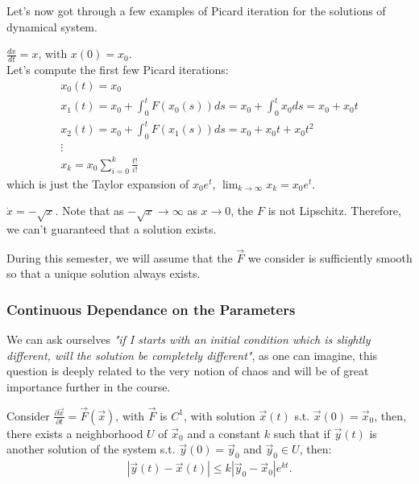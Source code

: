 Let's now got through a few examples of Picard iteration for the solutions of dynamical system.

\begin{example}
    $\frac{dx}{dt} = x$, with $x(0) = x_0$. \\ 
    
    Let's compute the first few Picard iterations:
    \begin{align*}
        x_0(t) = x_0\\
        x_1(t) = x_0 + \int_0^t F(x_0(s)) ds = x_0 + \int_0^t x_0 ds = x_0 + x_0 t  \\
        x_2(t) = x_0 + \int_0^t F(x_1(s)) ds = x_0 + x_0 t + x_0 t^2 \\
        \vdots \\
        x_k = x_0 \sum^k_{i=0} \frac{t!}{i!}
    \end{align*}
    which is just the Taylor expansion of $x_0 e^t$, $\lim_{k \rightarrow \infty} x_k = x_0 e^t$. 
\end{example}

\begin{example}
    $\dot{x} = - \sqrt{x}$. Note that as $-\sqrt{x} \rightarrow \infty$ as $x \rightarrow 0$, the $F$ is not Lipschitz. Therefore, we can't guaranteed that a solution exists.
\end{example}

During this semester, we will assume that the $\vec{F}$ we consider is sufficiently smooth so that a unique solution always exists. 

\subsubsection{Continuous Dependance on the Parameters}

We can ask ourselves \textit{"if I starts with an initial condition which is slightly different, will the solution be completely different"}, as one can imagine, this question is deeply related to the very notion of chaos and will be of great importance further in the course. 

\begin{theorem}
    Consider $\frac{\partial \vec{x}}{\partial t} = \vec{F}(\vec{x})$, with $\vec{F}$ is $C^1$, with solution $\vec{x}(t)$ s.t. $\vec{x}(0) = \vec{x}_0$, then, there exists a neighborhood $U$ of $\vec{x}_0$ and a constant $k$ such that if $\vec{y}(t)$ is another solution of the system s.t. $\vec{y}(0) = \vec{y}_0$ and $\vec{y}_0 \in U$, then:
    \begin{align*}
        |\vec{y}(t) - \vec{x}(t)| \leq k |\vec{y}_0 - \vec{x}_0|e^{kt}.
    \end{align*}    
\end{theorem}

